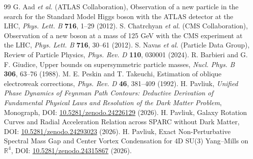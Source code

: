 \documentclass[11pt,a4paper]{article}
\begin{document}
\begin{thebibliography}{99}
 G. Aad \textit{et al.} (ATLAS Collaboration), Observation of a new particle in the search for the Standard Model Higgs boson with the ATLAS detector at the LHC, \textit{Phys. Lett. B} \textbf{716}, 1--29 (2012).
 S. Chatrchyan \textit{et al.} (CMS Collaboration), Observation of a new boson at a mass of 125 GeV with the CMS experiment at the LHC, \textit{Phys. Lett. B} \textbf{716}, 30--61 (2012).
 S. Navas \textit{et al.} (Particle Data Group), Review of Particle Physics, \textit{Phys. Rev. D} \textbf{110}, 030001 (2024).
 R. Barbieri and G. F. Giudice, Upper bounds on supersymmetric particle masses, \textit{Nucl. Phys. B} \textbf{306}, 63--76 (1988).
 M. E. Peskin and T. Takeuchi, Estimation of oblique electroweak corrections, \textit{Phys. Rev. D} \textbf{46}, 381--409 (1992).
 H. Pavliuk, \textit{Unified Phase Dynamics of Feynman Path Contours: Deductive Derivation of Fundamental Physical Laws and Resolution of the Dark Matter Problem}, Monograph, DOI: \href{https://doi.org/10.5281/zenodo.24226129}{10.5281/zenodo.24226129} (2026).
 H. Pavliuk, Galaxy Rotation Curves and Radial Acceleration Relation across SPARC without Dark Matter, DOI: \href{https://doi.org/10.5281/zenodo.24293023}{10.5281/zenodo.24293023} (2026).
 H. Pavliuk, Exact Non-Perturbative Spectral Mass Gap and Center Vortex Condensation for 4D SU(3) Yang--Mills on $\mathbb{R}^4$, DOI: \href{https://doi.org/10.5281/zenodo.24315867}{10.5281/zenodo.24315867} (2026).
\end{thebibliography}
\end{document}
